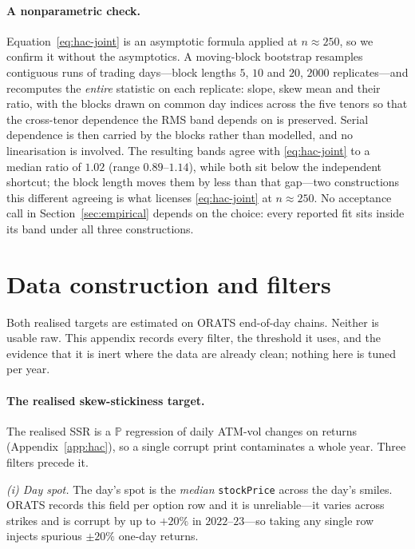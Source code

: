 \documentclass[11pt]{article}
\providecommand{\1}{\mathbf 1}
\begin{document}
\paragraph{A nonparametric check.} Equation~\eqref{eq:hac-joint} is an asymptotic formula applied at
$n\approx250$, so we confirm it without the asymptotics. A moving-block bootstrap resamples
contiguous runs of trading days---block lengths $5$, $10$ and $20$, $2000$ replicates---and
recomputes the \emph{entire} statistic on each replicate: slope, skew mean and their ratio, with the
blocks drawn on common day indices across the five tenors so that the cross-tenor dependence the RMS
band depends on is preserved. Serial dependence is then carried by the blocks rather than modelled,
and no linearisation is involved. The resulting bands agree with \eqref{eq:hac-joint} to a median
ratio of $1.02$ (range $0.89$--$1.14$), while both sit below the independent shortcut; the block
length moves them by less than that gap---two constructions this different agreeing is what licenses
\eqref{eq:hac-joint} at $n\approx250$. No acceptance call in Section~\ref{sec:empirical} depends on the choice: every
reported fit sits inside its band under all three constructions.

\section{Data construction and filters}
\label{app:data}
Both realised targets are estimated on ORATS end-of-day chains. Neither is usable raw. This appendix
records every filter, the threshold it uses, and the evidence that it is inert where the data are
already clean; nothing here is tuned per year.

\paragraph{The realised skew-stickiness target.} The realised SSR is a $\mathbb P$ regression of daily
ATM-vol changes on returns (Appendix~\ref{app:hac}), so a single corrupt print contaminates a whole
year. Three filters precede it.

\emph{(i) Day spot.} The day's spot is the \emph{median} \texttt{stockPrice} across the day's smiles.
ORATS records this field per option row and it is unreliable---it varies across strikes and is corrupt
by up to $+20\%$ in $2022$--$23$---so taking any single row injects spurious ${\pm}20\%$ one-day
returns.
\end{document}
